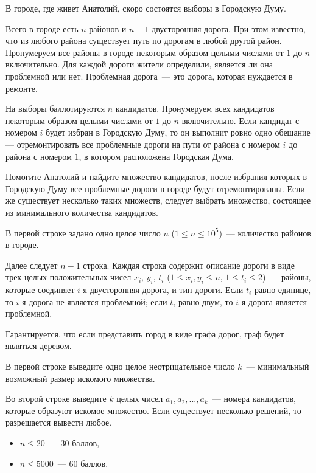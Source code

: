 
В городе, где живет Анатолий, скоро состоятся выборы в Городскую Думу.

Всего в городе есть $n$ районов и $n - 1$ двусторонняя дорога. При этом известно, что из любого района существует путь по дорогам в любой другой район. Пронумеруем все районы в городе некоторым образом целыми числами от $1$ до $n$ включительно. Для каждой дороги жители определили, является ли она проблемной или нет. Проблемная дорога~--- это дорога, которая нуждается в ремонте.

На выборы баллотируются $n$ кандидатов. Пронумеруем всех кандидатов некоторым образом целыми числами от $1$ до $n$ включительно. Если кандидат с номером $i$ будет избран в Городскую Думу, то он выполнит ровно одно обещание — отремонтировать все проблемные дороги на пути от района с номером $i$ до района с номером $1$, в котором расположена Городская Дума.

Помогите Анатолий и найдите множество кандидатов, после избрания которых в Городскую Думу все проблемные дороги в городе будут отремонтированы. Если же существует несколько таких множеств, следует выбрать множество, состоящее из минимального количества кандидатов.

\Input
В первой строке задано одно целое число $n$ ($1 \le n \le 10^{5}$)~--- количество районов в городе.

Далее следует $n - 1$ строка. Каждая строка содержит описание дороги в виде трех целых положительных чисел $x_i$, $y_i$, $t_i$ ($1 \le x_i, y_i \le n$, $1 \le t_i \le 2$)~--- районы, которые соединяет $i$-я двусторонняя дорога, и тип дороги. Если $t_i$ равно единице, то $i$-я дорога не является проблемной; если $t_i$ равно двум, то $i$-я дорога является проблемной.

Гарантируется, что если представить город в виде графа дорог, граф будет являться деревом.

\Output
В первой строке выведите одно целое неотрицательное число $k$~--- минимальный возможный размер искомого множества.

Во второй строке выведите $k$ целых чисел $a_1, a_2, ..., a_k$~--- номера кандидатов, которые образуют искомое множество. Если существует несколько решений, то разрешается вывести любое.

\Samples
\BeginTests
\EndTests

\Scoring
\begin{itemize}
	\item $n \le 20$~--- 30 баллов,
	\item $n \le 5000$~--- 60 баллов.
\end{itemize}

\EndProblem
